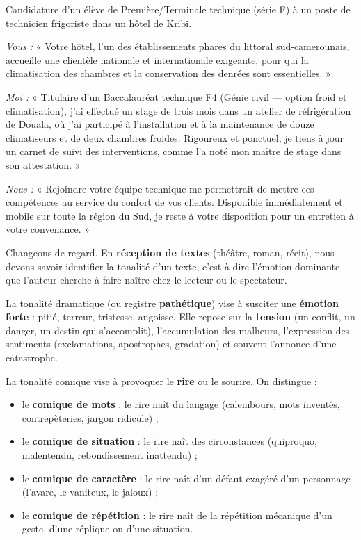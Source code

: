 \documentclass[11pt]{article}
\newcommand{\cle}[1]{{\popxbold\color{popdark}#1}}
\newcounter{popsec}
\newcounter{popsub}
\newcommand{\courssub}[1]{%
  \stepcounter{popsub}%
  \par\vspace{9pt}\noindent{\popxbold\fontsize{11.5}{13}\selectfont\color{popink}{\color{poporange}\thepopsec.\thepopsub}\hspace{6pt}#1}\par\nopagebreak\vspace{4pt}
}
\begin{document}
\begin{exemplebox}
Candidature d'un élève de Première/Terminale technique (série F) à un poste de technicien frigoriste dans un hôtel de Kribi.

\emph{Vous :} « Votre hôtel, l'un des établissements phares du littoral sud-camerounais, accueille une clientèle nationale et internationale exigeante, pour qui la climatisation des chambres et la conservation des denrées sont essentielles. »

\emph{Moi :} « Titulaire d'un Baccalauréat technique F4 (Génie civil — option froid et climatisation), j'ai effectué un stage de trois mois dans un atelier de réfrigération de Douala, où j'ai participé à l'installation et à la maintenance de douze climatiseurs et de deux chambres froides. Rigoureux et ponctuel, je tiens à jour un carnet de suivi des interventions, comme l'a noté mon maître de stage dans son attestation. »

\emph{Nous :} « Rejoindre votre équipe technique me permettrait de mettre ces compétences au service du confort de vos clients. Disponible immédiatement et mobile sur toute la région du Sud, je reste à votre disposition pour un entretien à votre convenance. »
\end{exemplebox}

\courssub{Les tonalités : dramatique et comique}

Changeons de regard. En \textbf{réception de textes} (théâtre, roman, récit), nous devons savoir identifier la \cle{tonalité} d'un texte, c'est-à-dire l'émotion dominante que l'auteur cherche à faire naître chez le lecteur ou le spectateur.

\begin{definition}
La \cle{tonalité dramatique} (ou registre \textbf{pathétique}) vise à susciter une \textbf{émotion forte} : pitié, terreur, tristesse, angoisse. Elle repose sur la \textbf{tension} (un conflit, un danger, un destin qui s'accomplit), l'accumulation des malheurs, l'expression des sentiments (exclamations, apostrophes, gradation) et souvent l'annonce d'une catastrophe.

La \cle{tonalité comique} vise à provoquer le \textbf{rire} ou le sourire. On distingue :
\begin{itemize}
\item le \textbf{comique de mots} : le rire naît du langage (calembours, mots inventés, contrepèteries, jargon ridicule) ;
\item le \textbf{comique de situation} : le rire naît des circonstances (quiproquo, malentendu, rebondissement inattendu) ;
\item le \textbf{comique de caractère} : le rire naît d'un défaut exagéré d'un personnage (l'avare, le vaniteux, le jaloux) ;
\item le \textbf{comique de répétition} : le rire naît de la répétition mécanique d'un geste, d'une réplique ou d'une situation.
\end{itemize}
\end{definition}
\end{document}
